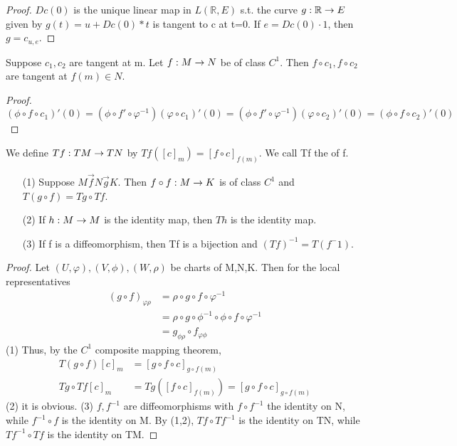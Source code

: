 \begin{proof}
$Dc(0)$ is the unique linear map in $L(\mathbb{R},E)$ s.t. the curve ${g}:{\mathbb{R}}\rightarrow{E}$ given by $g(t)=u+Dc(0)*t$ is tangent to c
at t=0. If $e=Dc(0)\cdot 1$, then $g= c_{u,e}$.
\end{proof}
\begin{prop}
Suppose $c_1,c_2$ are tangent at m. Let ${f}:{M}\rightarrow{N}$ be of class $C^1$. Then $f\circ c_1, f\circ c_2$ are tangent at $f(m)\in N$.
\end{prop}
\begin{proof}
$(\phi\circ f\circ c_1)'(0)=(\phi\circ f'\circ\varphi^{-1})(\varphi\circ c_1)'(0)=(\phi\circ f'\circ\varphi^{-1})(\varphi\circ c_2)'(0)
=(\phi\circ f\circ c_2)'(0)$
\end{proof}
\begin{definition}
We define ${Tf}:{TM}\rightarrow{TN}$ by $Tf([c]_m)=[f\circ c]_{f(m)}$. We call Tf the  of f.
\end{definition}
\begin{thm}
\begin{enumerate}
\item[(1)] Suppose $M\overset{\rightarrow}{f}N\overset{\rightarrow}{g}K$. Then ${f\circ f}:{M}\rightarrow{K}$ is of class $C^1$ and $T(g\circ f)
=Tg\circ Tf$.
\item[(2)] If ${h}:{M}\rightarrow{M}$ is the identity map, then $Th$ is the identity map.
\item[(3)] If f is a diffeomorphism, then Tf is a bijection and $(Tf)^{-1}= T(f^-1)$.
\end{enumerate}
\end{thm}
\begin{proof}
Let $(U,\varphi),(V,\phi),(W,\rho)$ be charts of M,N,K. Then for the local representatives 
\begin{align*}
(g\circ f)_{\varphi\rho} &=\rho\circ g\circ f\circ\varphi^{-1} \\
                         &=\rho\circ g\circ\phi^{-1}\circ\phi\circ f\circ\varphi^{-1} \\
                         &=g_{\phi\rho}\circ f_{\varphi\phi}
\end{align*}
(1) Thus, by the $C^1$ composite mapping theorem,
\begin{align*}
T(g\circ f)[c]_m &= [g\circ f\circ c]_{g\circ f(m)} \\
Tg\circ Tf[c]_m  &= Tg([f\circ c]_{f(m)}) = [g\circ f\circ c]_{g\circ f(m)}
\end{align*}
(2) it is obvious. (3) $f,f^{-1}$ are diffeomorphisms with $f\circ f^{-1}$ the identity on N, while $f^{-1}\circ f$ is the identity on M.
By (1,2), $Tf\circ Tf^{-1}$ is the identity on TN, while $Tf^{-1}\circ Tf$ is the identity on TM.
\end{proof}
